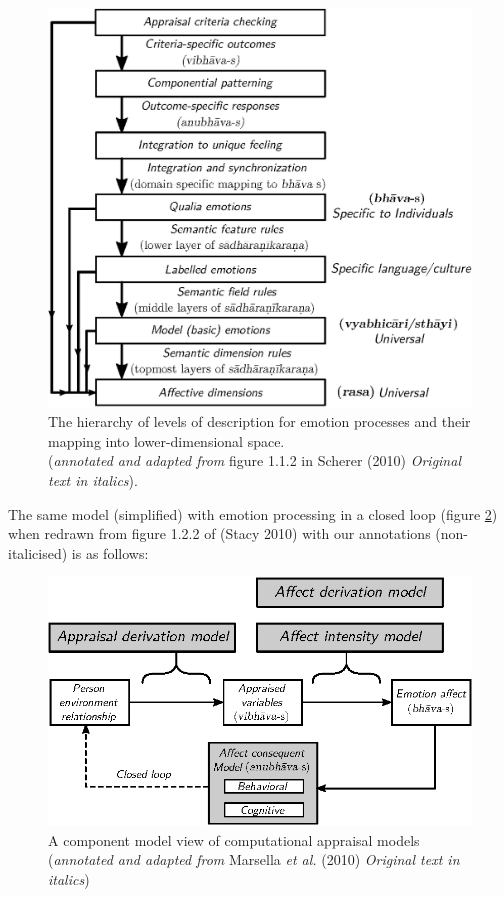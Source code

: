 \begin{figure}[H]
\centering
\includegraphics[scale=.72]{figures/3.eps}
\smallskip
\caption{The hierarchy of levels of description for emotion processes and their mapping into lower-dimensional space.\\
(\textsl{annotated and adapted from} figure 1.1.2 in Scherer (2010) \textsl{Original text in italics}).}\label{chap3-fig1}
\end{figure}


The same model (simplified) with emotion processing in a closed loop (figure \ref{chap3-fig2}) when redrawn from figure 1.2.2 of (Stacy 2010) with our annotations (non-italicised) is as follows:
\begin{figure}[ht]
\centering
\includegraphics[scale=.85]{figures/4.eps}
\caption{A component model view of computational appraisal models (\textsl{annotated and adapted from} Marsella \textsl{et al.} (2010) \textsl{Original text in italics})}\label{chap3-fig2}
\end{figure}

